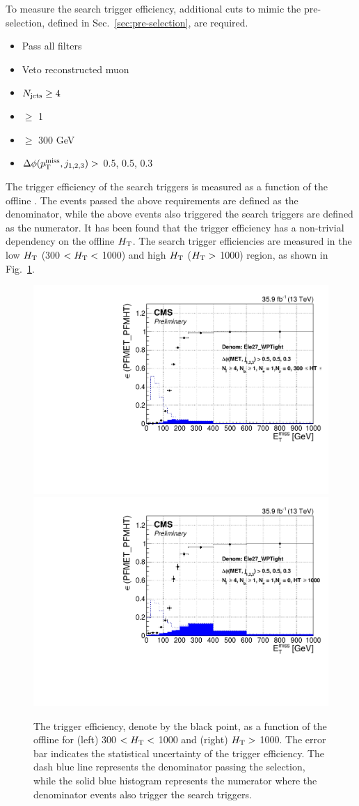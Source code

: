 To measure the search trigger efficiency, additional cuts to mimic the
pre-selection, defined in Sec.~\ref{sec:pre-selection}, are required.
\begin{itemize}
  \item Pass all filters
  \item Veto reconstructed muon
  \item $N_{\text{jets}}\geq4$
  \item \nbjets $\ge$ 1
  \item \HT $\ge$ 300 GeV
  \item $\Delta\phi(p^{\rm miss}_{\rm T}, j_{1,2,3})>$ 0.5, 0.5, 0.3
\end{itemize}

The trigger efficiency of the search triggers is measured as a function of
the offline \MET.  The events passed the above requirements are defined as the
denominator, while the above events also triggered the search triggers are
defined as the numerator. It has been found that the \MET trigger efficiency
has a non-trivial dependency on the offline $H_{\mathrm{T}}$. The search trigger
efficiencies are measured in the low $H_{\mathrm{T}}$ (300 $< H_{\mathrm{T}} <$ 1000) and high
$H_{\mathrm{T}}$ ($H_{\mathrm{T}} >$ 1000) region, as shown in Fig.~\ref{fig:TrigMET}.
\begin{figure}[tbp]
 \begin{center}
   \includegraphics[width=0.49\linewidth]{sections/mc4/EvtSelSBOpt/figures/TrigEle_Stop_TrigMET_HTLess1000_9.pdf}
   \includegraphics[width=0.49\linewidth]{sections/mc4/EvtSelSBOpt/figures/TrigEle_Stop_TrigMET_HTMore1000_9.pdf}
   \caption{ The trigger efficiency, denote by the black point, as a function
   of the offline \MET for (left) 300 $< H_{\mathrm{T}} <$ 1000 and (right) $H_{\mathrm{T}} >$ 1000.
   The error bar indicates the statistical uncertainty of the trigger
   efficiency. The dash blue line represents the denominator passing the
   selection, while the solid blue histogram represents the numerator where
   the denominator events also trigger the search triggers. }
   \label{fig:TrigMET}
 \end{center}
\end{figure}


